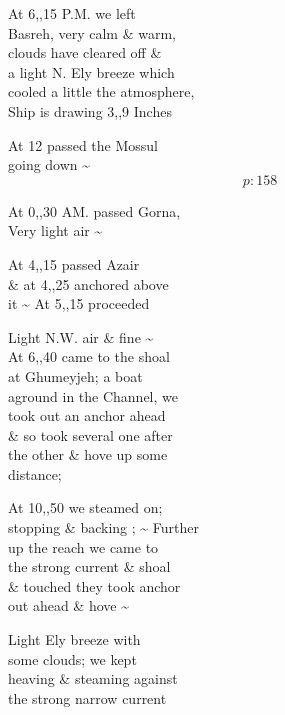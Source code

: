 \documentclass{report}
\begin{document}
	\par{
 	At 6,,15 P.M. we left\ \\Basreh, very calm \& warm,\ \\clouds have cleared off \&\ \\a light N. Ely breeze which\ \\cooled a little the atmosphere,\ \\Ship is drawing 3,,9 Inches\ \\
	}

	\par{
 	At 12 passed the Mossul\ \\going down \~{}\ \\
  \[p: 158 \]

	}


	\par{
 	At 0,,30 AM. passed Gorna,\ \\Very light air \~{}\ \\
	}

	\par{
 	At 4,,15 passed Azair\ \\\& at 4,,25 anchored above\ \\it \~{} At 5,,15 proceeded\ \\
	}

	\par{
 	Light N.W. air \& fine \~{}\ \\At 6,,40 came to the shoal\ \\at Ghumeyjeh; a boat\ \\aground in the Channel, we\ \\took out an anchor ahead\ \\\& so took several one after\ \\the other \& hove up some\ \\distance;\ \\
	}

	\par{
 	At 10,,50 we steamed on;\ \\stopping \& backing ; \~{} Further\ \\up the reach we came to\ \\the strong current \& shoal\ \\\& touched they took anchor\ \\out ahead \& hove \~{}\ \\
	}

	\par{
 	Light Ely breeze with\ \\some clouds; we kept\ \\heaving \& steaming against\ \\the strong narrow current\ \\
	}
\end{document}
